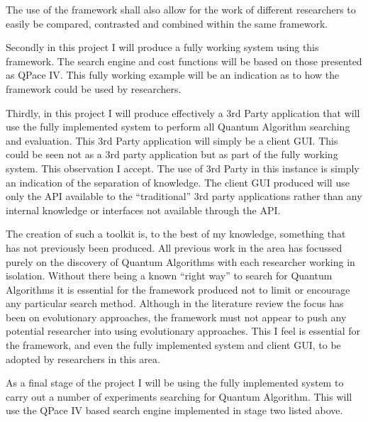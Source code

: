 \documentclass[authoryearcitations]{UoYCSproject}
\begin{document}
The use of the framework shall also allow for the work of different researchers to easily be compared, contrasted and combined within the same framework.

Secondly in this project I will produce a fully working system using this framework.
The search engine and cost functions will be based on those presented as QPace IV\cite{masseythesis}.
This fully working example will be an indication as to how the framework could be used by researchers.

Thirdly, in this project I will produce effectively a 3rd Party application that will use the fully implemented system to perform all Quantum Algorithm searching and evaluation.
This 3rd Party application will simply be a client GUI.
This could be seen not as a 3rd party application but as part of the fully working system.
This observation I accept.
The use of 3rd Party in this instance is simply an indication of the separation of knowledge.
The client GUI produced will use only the API available to the ``traditional'' 3rd party applications rather than any internal knowledge or interfaces not available through the API.

The creation of such a toolkit is, to the best of my knowledge, something that has not previously been produced.
All previous work in the area has focussed purely on the discovery of Quantum Algorithms with each researcher working in isolation.
Without there being a known ``right way'' to search for Quantum Algorithms it is essential for the framework produced not to limit or encourage any particular search method.
Although in the literature review the focus has been on evolutionary approaches, the framework must not appear to push any potential researcher into using evolutionary approaches.
This I feel is essential for the framework, and even the fully implemented system and client GUI, to be adopted by researchers in this area.

As a final stage of the project I will be using the fully implemented system to carry out a number of experiments searching for Quantum Algorithm.
This will use the QPace IV based search engine implemented in stage two listed above.

\end{document}
